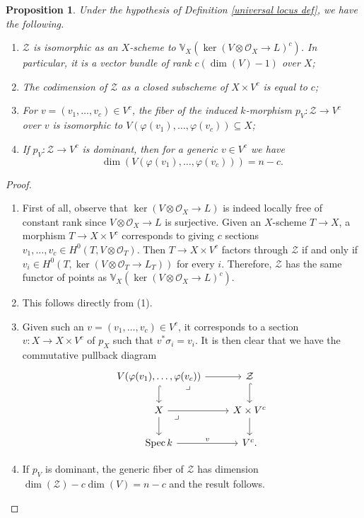 \documentclass[a4paper,12pt]{amsart}
\newtheorem{proposition}[definition]{Proposition}
\numberwithin{equation}{section}
\DeclareMathOperator{\Spec}{Spec}
\renewcommand{\_}{\rule{0.25cm}{0.4pt}}
\begin{document}
\begin{proposition}\label{universal locus prop}
Under the hypothesis of Definition \ref{universal locus def}, we have the following.
    \begin{enumerate}
        \item $\mathcal{Z}$ is isomorphic as an $X$-scheme to $\mathbb{V}_{X}(\ker(V\otimes\mathcal{O}_{X}\to L)^{c})$. In particular, it is a vector bundle of rank $c(\dim(V)-1)$ over $X$;
        \item The codimension of $\mathcal{Z}$ as a closed subscheme of $X\times V^{c}$ is equal to $c$;
        \item For $v=(v_{1},\dots, v_{c})\in V^{c}$, the fiber of the induced $k$-morphism $p_{V}\colon \mathcal{Z}\to V^{c}$ over $v$ is isomorphic to $V(\varphi(v_{1}),\dots, \varphi(v_{c}))\subseteq X$;
        \item If $p_{V}\colon \mathcal{Z}\to V^{c}$ is dominant, then for a generic $v\in V^{c}$ we have
        \[
        \dim(V(\varphi(v_{1}),\dots, \varphi(v_{c})))=n-c.
        \]
    \end{enumerate}
\end{proposition}
\begin{proof}
    \hfill
\begin{enumerate}
    \item First of all, observe that $\ker(V\otimes\mathcal{O}_{X}\to L)$ is indeed locally free of constant rank since $V\otimes\mathcal{O}_{X}\to L$ is surjective. Given an $X$-scheme $T\to X$, a morphism $T\to X\times V^{c}$ corresponds to giving $c$ sections $v_{1},\dots, v_{c}\in H^{0}(T,V\otimes\mathcal{O}_{T})$. Then $T\to X\times V^{c}$ factors through $\mathcal{Z}$ if and only if $v_{i}\in H^{0}(T,\ker(V\otimes\mathcal{O}_{T}\to L_{T}))$ for every $i$. Therefore, $\mathcal{Z}$ has the same functor of points as $\mathbb{V}_{X}(\ker(V\otimes\mathcal{O}_{X}\to L)^{c})$.
    \item This follows directly from (1).
    \item Given such an $v=(v_{1},\dots, v_{c})\in V^{c}$, it corresponds to a section $v\colon X\to X\times V^{c}$ of $p_{X}$ such that $v^{\ast}\sigma_{i}=v_{i}$. It is then clear that we have the commutative pullback diagram
    \[
    \begin{tikzcd}
    V(\varphi(v_{1}),\dots,\varphi(v_{c}))\ar[r]\ar[d, hookrightarrow]\arrow[dr, phantom, "\lrcorner", very near start] & \mathcal{Z}\ar[d, hookrightarrow]
    \\
    X\ar[r]\ar[d]\arrow[dr, phantom, "\lrcorner", very near start] & X\times V^{c}\ar[d]
    \\
    \Spec k\ar[r, "v"] & V^{c}.
    \end{tikzcd}
    \]
    \item If $p_{V}$ is dominant, the generic fiber of $\mathcal{Z}$ has dimension $\dim(\mathcal{Z})-c\dim(V)=n-c$ and the result follows.
\end{enumerate}
\end{proof}
\end{document}
